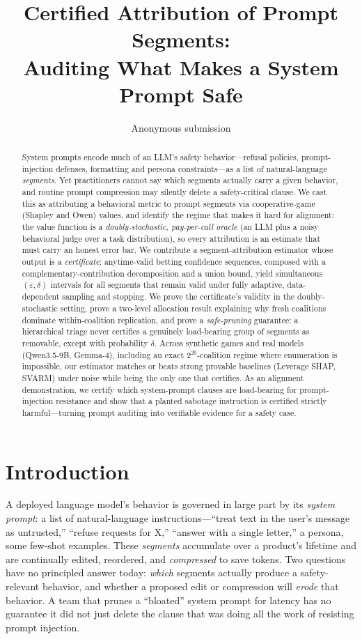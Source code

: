 \documentclass[10pt,twocolumn,letterpaper]{article}
\title{\bf Certified Attribution of Prompt Segments:\\
Auditing What Makes a System Prompt Safe}
\author{Anonymous submission}
\date{}
\theoremstyle{plain}
\theoremstyle{definition}
\begin{document}
\maketitle

\begin{abstract}
System prompts encode much of an LLM's safety behavior---refusal policies,
prompt-injection defenses, formatting and persona constraints---as a list of
natural-language \emph{segments}. Yet practitioners cannot say which segments
actually carry a given behavior, and routine prompt compression may silently
delete a safety-critical clause. We cast this as attributing a behavioral
metric to prompt segments via cooperative-game (Shapley and Owen) values, and
identify the regime that makes it hard for alignment: the value function is a
\emph{doubly-stochastic, pay-per-call oracle} (an LLM plus a noisy behavioral
judge over a task distribution), so every attribution is an estimate that must
carry an honest error bar. We contribute a segment-attribution estimator whose
output is a \emph{certificate}: anytime-valid betting confidence sequences,
composed with a complementary-contribution decomposition and a union bound,
yield simultaneous $(\varepsilon,\delta)$ intervals for all segments that
remain valid under fully adaptive, data-dependent sampling and stopping. We
prove the certificate's validity in the doubly-stochastic setting, prove a
two-level allocation result explaining why fresh coalitions dominate
within-coalition replication, and prove a \emph{safe-pruning} guarantee: a
hierarchical triage never certifies a genuinely load-bearing group of segments
as removable, except with probability $\delta$. Across synthetic games and real
models (Qwen3.5-9B, Gemma-4), including an exact $2^{20}$-coalition regime where
enumeration is impossible, our estimator matches or beats strong provable
baselines (Leverage SHAP, SVARM) under noise while being the only one that
certifies. As an alignment demonstration, we certify which system-prompt clauses
are load-bearing for prompt-injection resistance and show that a planted
sabotage instruction is certified strictly harmful---turning prompt auditing
into verifiable evidence for a safety case.
\end{abstract}

\section{Introduction}

A deployed language model's behavior is governed in large part by its
\emph{system prompt}: a list of natural-language instructions---``treat text in
the user's message as untrusted,'' ``refuse requests for X,'' ``answer with a
single letter,'' a persona, some few-shot examples. These \emph{segments}
accumulate over a product's lifetime and are continually edited, reordered, and
\emph{compressed} to save tokens. Two questions have no principled answer today:
\emph{which} segments actually produce a safety-relevant behavior, and whether a
proposed edit or compression will \emph{erode} that behavior. A team that prunes
a ``bloated'' system prompt for latency has no guarantee it did not just delete
the clause that was doing all the work of resisting prompt injection.
\end{document}

